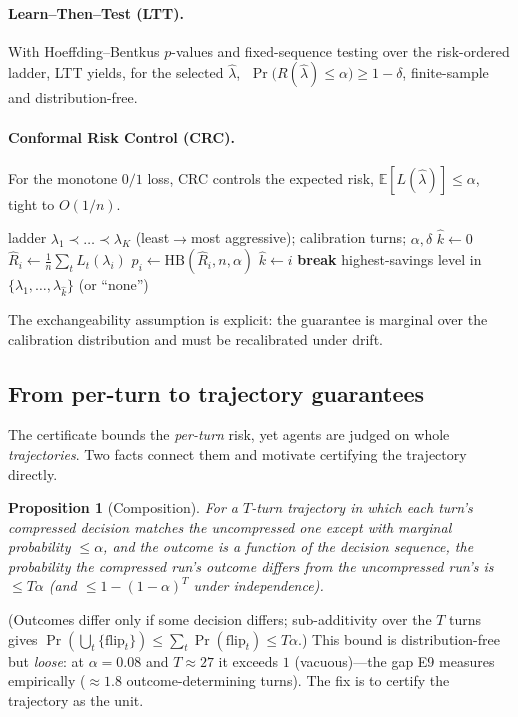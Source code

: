 \documentclass{article}
\newtheorem{proposition}{Proposition}
\begin{document}
\paragraph{Learn--Then--Test (LTT).} With Hoeffding--Bentkus $p$-values and
fixed-sequence testing over the risk-ordered ladder, LTT yields, for the selected
$\hat\lambda$, $\;\Pr\!\big(R(\hat\lambda)\le\alpha\big)\ge 1-\delta$, finite-sample
and distribution-free.
\paragraph{Conformal Risk Control (CRC).} For the monotone $0/1$ loss, CRC controls
the expected risk, $\mathbb{E}[L(\hat\lambda)]\le\alpha$, tight to $O(1/n)$.

\begin{algorithm}[t]
\caption{LTT certification over the compression ladder}
\label{alg:ltt}
\begin{algorithmic}[1]
\Require ladder $\lambda_1\!\prec\!\dots\!\prec\!\lambda_K$ (least$\to$most aggressive); calibration turns; $\alpha,\delta$
\State $\hat k \gets 0$
  \State $\hat R_i \gets \frac{1}{n}\sum_t L_t(\lambda_i)$ 
  \State $p_i \gets \mathrm{HB}(\hat R_i, n, \alpha)$ 
   $\hat k \gets i$ 
  \Else{} \textbf{break} 
  \EndIf
\EndFor
\State \Return highest-savings level in $\{\lambda_1,\dots,\lambda_{\hat k}\}$ (or ``none'')
\end{algorithmic}
\end{algorithm}

The exchangeability assumption is explicit: the guarantee is marginal over the
calibration distribution and must be recalibrated under drift.

\subsection{From per-turn to trajectory guarantees}
\label{sec:traj-theory}
The certificate bounds the \emph{per-turn} risk, yet agents are judged on whole
\emph{trajectories}. Two facts connect them and motivate certifying the trajectory directly.

\begin{proposition}[Composition]\label{prop:compose}
For a $T$-turn trajectory in which each turn's compressed decision matches the uncompressed
one except with marginal probability $\le\alpha$, and the outcome is a function of the decision
sequence, the probability the compressed run's outcome differs from the uncompressed run's is
$\le T\alpha$ (and $\le 1-(1-\alpha)^{T}$ under independence).
\end{proposition}
\noindent (Outcomes differ only if some decision differs; sub-additivity over the $T$ turns
gives $\Pr(\bigcup_t\{\text{flip}_t\})\le\sum_t\Pr(\text{flip}_t)\le T\alpha$.) This bound is
distribution-free but \emph{loose}: at $\alpha=0.08$ and $T\approx27$
it exceeds $1$ (vacuous)---the gap E9 measures empirically ($\approx1.8$ outcome-determining
turns). The fix is to certify the trajectory as the unit.
\end{document}
